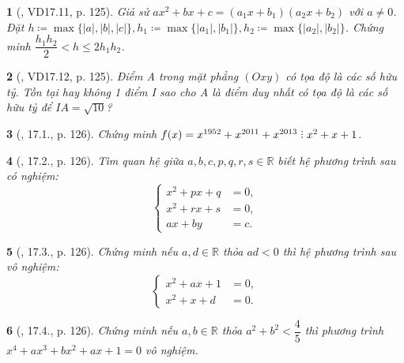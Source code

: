 \documentclass{article}
\newtheorem{baitoan}{}
\DeclareRobustCommand{\divby}{%
	\mathrel{\vbox{\baselineskip.65ex\lineskiplimit0pt\hbox{.}\hbox{.}\hbox{.}}}%
}
\begin{document}
\begin{baitoan}[\cite{TLCT_THCS_Toan_9_dai_so}, VD17.11, p. 125]
	Giả sử $ax^2 + bx + c = (a_1x + b_1)(a_2x + b_2)$ với $a\ne0$. Đặt $h\coloneqq\max\{|a|,|b|,|c|\},h_1\coloneqq\max\{|a_1|,|b_1|\},h_2\coloneqq\max\{|a_2|,|b_2|\}$. Chứng minh $\dfrac{h_1h_2}{2} < h\le2h_1h_2$.
\end{baitoan}

\begin{baitoan}[\cite{TLCT_THCS_Toan_9_dai_so}, VD17.12, p. 125]
	Điểm A trong mặt phẳng $(Oxy)$ có tọa độ là các số hữu tỷ. Tồn tại hay không 1 điểm I sao cho A là điểm duy nhất có tọa độ là các số hữu tỷ để $IA = \sqrt{10}$?
\end{baitoan}

\begin{baitoan}[\cite{TLCT_THCS_Toan_9_dai_so}, 17.1., p. 126]
	Chứng minh $f(x) = x^{1952} + x^{2011} + x^{2013}\divby x^2 + x + 1$.
\end{baitoan}

\begin{baitoan}[\cite{TLCT_THCS_Toan_9_dai_so}, 17.2., p. 126]
	Tìm quan hệ giữa $a,b,c,p,q,r,s\in\mathbb{R}$ biết hệ phương trình sau có nghiệm:
	\begin{equation*}
		\left\{\begin{split}
			x^2 + px + q &= 0,\\
			x^2 + rx + s &= 0,\\
			ax + by &= c.
		\end{split}\right.
	\end{equation*}
\end{baitoan}

\begin{baitoan}[\cite{TLCT_THCS_Toan_9_dai_so}, 17.3., p. 126]
	Chứng minh nếu $a,d\in\mathbb{R}$ thỏa $ad < 0$ thì hệ phương trình sau vô nghiệm:
	\begin{equation*}
		\left\{\begin{split}
			x^2 + ax + 1 &= 0,\\
			x^2 + x + d &= 0.
		\end{split}\right.
	\end{equation*}
\end{baitoan}

\begin{baitoan}[\cite{TLCT_THCS_Toan_9_dai_so}, 17.4., p. 126]
	Chứng minh nếu $a,b\in\mathbb{R}$ thỏa $a^2 + b^2 < \dfrac{4}{5}$ thì phương trình $x^4 + ax^3 + bx^2 + ax + 1 = 0$ vô nghiệm.
\end{baitoan}
\end{document}
